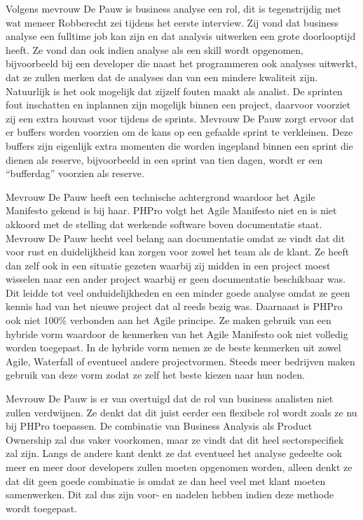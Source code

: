 \documentclass{hogent-article}
\begin{document}
Volgens mevrouw De Pauw is business analyse een rol, dit is tegenstrijdig met wat meneer Robberecht zei tijdens het eerste interview. Zij vond dat business analyse een fulltime job kan zijn en dat analysis uitwerken een grote doorlooptijd heeft. Ze vond dan ook indien analyse als een skill wordt opgenomen, bijvoorbeeld bij een developer die naast het programmeren ook analyses uitwerkt, dat ze zullen merken dat de analyses dan van een mindere kwaliteit zijn. Natuurlijk is het ook mogelijk dat zijzelf fouten maakt als analist. De sprinten fout inschatten en inplannen zijn mogelijk binnen een project, daarvoor voorziet zij een extra houvast voor tijdens de sprints. Mevrouw De Pauw zorgt ervoor dat er buffers worden voorzien om de kans op een gefaalde sprint te verkleinen. Deze buffers zijn eigenlijk extra momenten die worden ingepland binnen een sprint die dienen als reserve, bijvoorbeeld in een sprint van tien dagen, wordt er een “bufferdag” voorzien als reserve.

Mevrouw De Pauw heeft een technische achtergrond waardoor het Agile Manifesto gekend is bij haar. PHPro volgt het Agile Manifesto niet en is niet akkoord met de stelling dat werkende software boven documentatie staat. Mevrouw De Pauw hecht veel belang aan documentatie omdat ze vindt dat dit voor rust en duidelijkheid kan zorgen voor zowel het team als de klant. Ze heeft dan zelf ook in een situatie gezeten waarbij zij midden in een project moest wisselen naar een ander project waarbij er geen documentatie beschikbaar was. Dit leidde tot veel onduidelijkheden en een minder goede analyse omdat ze geen kennis had van het nieuwe project dat al reeds bezig was. Daarnaast is PHPro ook niet 100\% verbonden aan het Agile principe. Ze maken gebruik van een hybride vorm waardoor de kenmerken van het Agile Manifesto ook niet volledig worden toegepast. In de hybride vorm nemen ze de beste kenmerken uit zowel Agile, Waterfall of eventueel andere projectvormen. Steeds meer bedrijven maken gebruik van deze vorm zodat ze zelf het beste kiezen naar hun noden.

Mevrouw De Pauw is er van overtuigd dat de rol van business analisten niet zullen verdwijnen. Ze denkt dat dit juist eerder een flexibele rol wordt zoals ze nu bij PHPro toepassen. De combinatie van Business Analysis als Product Ownership zal dus vaker voorkomen, maar ze vindt dat dit heel sectorspecifiek zal zijn. Langs de andere kant denkt ze dat eventueel het analyse gedeelte ook meer en meer door developers zullen moeten opgenomen worden, alleen denkt ze dat dit geen goede combinatie is omdat ze dan heel veel met klant moeten samenwerken. Dit zal dus zijn voor- en nadelen hebben indien deze methode wordt toegepast.
\end{document}
